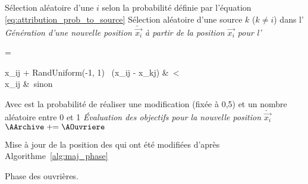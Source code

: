 \begin{algorithm}\label{alg:onlooker_phase}
  \SetAlgoVlined
  \DontPrintSemicolon
  \For{$\AOuvriere \in \AOnlookers$}
    {
      Sélection aléatoire d’une \ASource $i$ selon la probabilité
      définie par l’équation \eqref{eq:attribution_prob_to_source}\;
      Sélection aléatoire d’une source $k$ ($k \neq i$) dans l’\AArchive\;
       \emph{Génération d’une nouvelle position $\check{\vec{x_{i}}}$ à partir de la
                         position $\vec{x_{i}}$ pour l’\AOuvriere }\;
      {
      \begin{algomathdisplay}
         =%
          \begin{cases}
            x_{ij}  + RandUniform(-1, 1)   \times \ (x_{ij} - x_{kj}) &\ \ATirageB < \AMR \\
            x_{ij}                                                    &\ sinon
          \end{cases}
      \end{algomathdisplay}
      }
      \BlankLine
      Avec \AMR est la probabilité de réaliser une modification (fixée à 0,5) et
      \ATirageB un nombre aléatoire entre 0 et 1\;
      \BlankLine
       \emph{Évaluation des objectifs pour la nouvelle position $\check{\vec{x_{i}}}$}\;
      \BlankLine
      {
        $\AArchive \pluseq \AOuvriere$ 
      }
    }

  Mise à jour de la position des \ASources qui ont été modifiées d’après Algorithme~\ref{alg:maj_phase}\;
  \caption{Phase des ouvrières.}
\end{algorithm}

